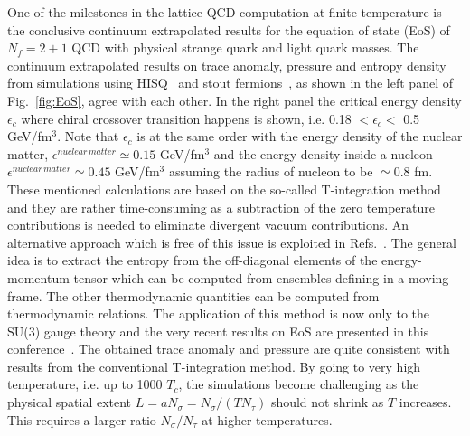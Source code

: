 \documentclass{PoS}
\begin{document}
One of the milestones in the lattice QCD computation at finite temperature is the conclusive continuum extrapolated results for the equation of state (EoS) of $N_f=2+1$ QCD
with physical strange quark and light quark masses. The continuum extrapolated results on trace anomaly, pressure and entropy density from simulations using HISQ~\cite{Bazavov:2014pvz} and stout fermions~\cite{Borsanyi:2013bia}, as shown in the left panel of Fig.~\ref{fig:EoS}, agree with each other. In the right panel the critical energy density $\epsilon_c$ where chiral crossover transition happens is shown, i.e. 0.18 $<\epsilon_c < $ 0.5 GeV/fm$^3$. Note that $\epsilon_c$ is at the same order with the energy density of the nuclear matter, $\epsilon^{nuclear\,matter}\simeq 0.15$ GeV/fm$^3$ and the energy density inside a nucleon $\epsilon^{nuclear\,matter}\simeq 0.45$ GeV/fm$^3$ assuming the radius of nucleon to be  $\simeq$0.8 fm.
These mentioned calculations are based on the so-called T-integration method~\cite{Boyd:1996bx} and they are rather time-consuming as a subtraction of the 
zero temperature contributions is needed to eliminate divergent vacuum contributions. An alternative approach which is free of this issue is exploited in Refs.~\cite{Giusti:2012yj,Giusti:2014ila,Giusti:2016iqr}.
The general idea is to extract the entropy from the off-diagonal elements of the energy-momentum tensor which can be computed from ensembles defining in a moving frame.  The other thermodynamic quantities can be computed from thermodynamic relations. The application of this method is now only to the SU(3) gauge theory and the very recent results on EoS are presented in this conference~\cite{Giusti:2016wsf}. The obtained trace anomaly and pressure are quite consistent with results from the conventional T-integration method.
By going to very high temperature, i.e. up to  1000 $T_c$, the simulations become challenging as the physical spatial extent $L=a N_\sigma=N_\sigma/(TN_\tau)$ should not shrink as $T$ increases. This requires a larger ratio $N_\sigma/N_\tau$ at higher temperatures.
\end{document}
